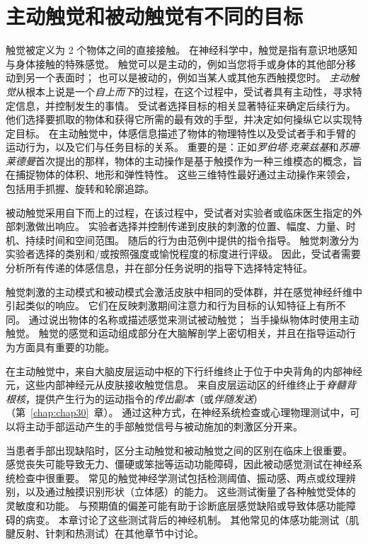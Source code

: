 \section{主动触觉和被动触觉有不同的目标}

触觉被定义为 2 个物体之间的直接接触。
在神经科学中，触觉是指有意识地感知与身体接触的特殊感觉。
触觉可以是主动的，例如当您将手或身体的其他部分移动到另一个表面时；
也可以是被动的，例如当某人或其他东西触摸您时。
\textit{主动触觉}从根本上说是一个\textit{自上而下}的过程，在这个过程中，受试者具有主动性，寻求特定信息，并控制发生的事情。
受试者选择目标的相关显著特征来确定后续行为。
他们选择要抓取的物体和获得它所需的最有效的手型，并决定如何操纵它以实现特定目标。
在主动触觉中，体感信息描述了物体的物理特性以及受试者手和手臂的运动行为，以及它们与任务目标的关系。
重要的是：正如\textit{罗伯塔$\cdot$克莱兹基}和\textit{苏珊$\cdot$莱德曼}首次提出的那样，物体的主动操作是基于触摸作为一种三维模态的概念，旨在捕捉物体的体积、地形和弹性特性。
这些三维特性最好通过主动操作来领会，包括用手抓握、旋转和轮廓追踪。


被动触觉采用自下而上的过程，在该过程中，受试者对实验者或临床医生指定的外部刺激做出响应。
实验者选择并控制传递到皮肤的刺激的位置、幅度、力量、时机、持续时间和空间范围。
随后的行为由范例中提供的指令指导。
触觉刺激分为实验者选择的类别和/或按照强度或愉悦程度的标度进行评级。
因此，受试者需要分析所有传递的体感信息，并在部分任务说明的指导下选择特定特征。


触觉刺激的主动模式和被动模式会激活皮肤中相同的受体群，并在感觉神经纤维中引起类似的响应。
它们在反映刺激期间注意力和行为目标的认知特征上有所不同。
通过说出物体的名称或描述感觉来测试被动触觉；
当手操纵物体时使用主动触觉。
触觉的感觉和运动组成部分在大脑解剖学上密切相关，并且在指导运动行为方面具有重要的功能。


在主动触觉中，来自大脑皮层运动中枢的下行纤维终止于位于中央背角的内部神经元，这些内部神经元从皮肤接收触觉信息。
来自皮层运动区的纤维终止于\textit{脊髓背根核}，提供产生行为的运动指令的\textit{传出副本}（或\textit{伴随发送}）（第~\ref{chap:chap30}~章）。
通过这种方式，在神经系统检查或心理物理测试中，可以将主动手部运动产生的手部触觉信号与被动施加的刺激区分开来。


当患者手部出现缺陷时，区分主动触觉和被动触觉之间的区别在临床上很重要。
感觉丧失可能导致无力、僵硬或笨拙等运动功能障碍，因此被动感觉测试在神经系统检查中很重要。
常见的触觉神经学测试包括检测阈值、振动感、两点或纹理辨别，以及通过触摸识别形状（立体感）的能力。 
这些测试衡量了各种触觉受体的灵敏度和功能。
与预期值的偏差可能有助于诊断底层感觉缺陷或导致体感功能障碍的病变。
本章讨论了这些测试背后的神经机制。
其他常见的体感功能测试（肌腱反射、针刺和热测试）在其他章节中讨论。




